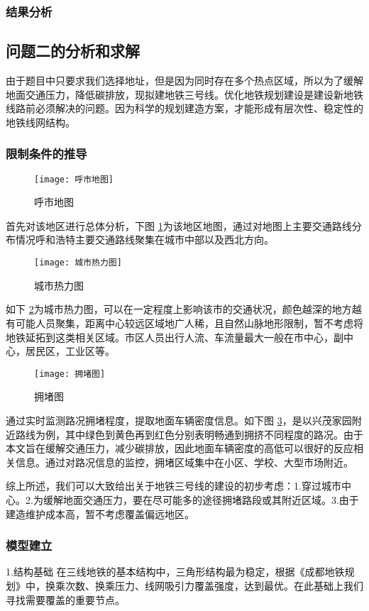 \documentclass[12pt,a4paper]{mcmthesis}
\begin{document}
\subsubsection{结果分析}

\subsection{问题二的分析和求解}
由于题目中只要求我们选择地址，但是因为同时存在多个热点区域，所以为了缓解地面交通压力，降低碳排放，现拟建地铁三号线。优化地铁规划建设是建设新地铁线路前必须解决的问题。因为科学的规划建造方案，才能形成有层次性、稳定性的地铁线网结构。
\subsubsection{限制条件的推导}
\begin{figure}[h!t]
	\centerline{\texttt{[image: 呼市地图]}\quad
	}
	\caption{\song\wuhao
		呼市地图}
	\label{fig:呼市地图}
\end{figure}
首先对该地区进行总体分析，下图 \ref{fig:呼市地图}为该地区地图，通过对地图上主要交通路线分布情况呼和浩特主要交通路线聚集在城市中部以及西北方向。
\begin{figure}[h!t]
	\centerline{\texttt{[image: 城市热力图]}\quad
	}
	\caption{\song\wuhao
		城市热力图}
	\label{fig:城市热力图}
\end{figure}
如下 \ref{fig:城市热力图}为城市热力图，可以在一定程度上影响该市的交通状况，颜色越深的地方越有可能人员聚集，距离中心较远区域地广人稀，且自然山脉地形限制，暂不考虑将地铁延拓到这类相关区域。市区人员出行人流、车流量最大一般在市中心，副中心，居民区，工业区等。
\begin{figure}[h!t]
	\centerline{\texttt{[image: 拥堵图]}\quad
	}
	\caption{\song\wuhao
		拥堵图}
	\label{fig:拥堵图}
\end{figure}


通过实时监测路况拥堵程度，提取地面车辆密度信息。如下图 \ref{fig:拥堵图}，是以兴茂家园附近路线为例，其中绿色到黄色再到红色分别表明畅通到拥挤不同程度的路况。由于本文旨在缓解交通压力，减少碳排放，因此地面车辆密度的高低可以很好的反应相关信息。通过对路况信息的监控，拥堵区域集中在小区、学校、大型市场附近。

综上所述，我们可以大致给出关于地铁三号线的建设的初步考虑：1.穿过城市中心。2.为缓解地面交通压力，要在尽可能多的途径拥堵路段或其附近区域。3.由于建造维护成本高，暂不考虑覆盖偏远地区。

\subsubsection{模型建立}
1.结构基础
在三线地铁的基本结构中，三角形结构最为稳定，根据《成都地铁规划》中，换乘次数、换乘压力、线网吸引力覆盖强度，达到最优。在此基础上我们寻找需要覆盖的重要节点。
\end{document}
